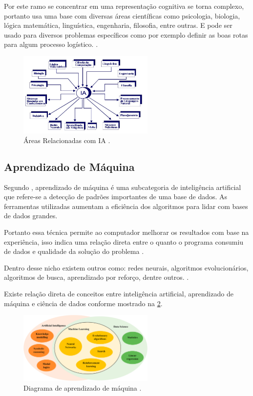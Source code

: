 \documentclass[
	12pt,				%
	openright,			%
	twoside,			%
	a4paper,			%
	english,			%
	french,				%
	spanish,			%
	brazil				%
	]{abntex2}
\begin{document}
Por este ramo se concentrar em uma representação cognitiva se torna complexo, portanto usa uma base com diversas áreas científicas como psicologia, biologia, lógica matemática, linguística, engenharia, filosofia, entre outras. E pode ser usado para diversos problemas específicos como por exemplo definir as boas rotas para algum processo logístico. \space\cite{ia_conceitos_aplicacoes}.

\begin{figure}[!ht]
	\centering
	\includegraphics[width=0.6\textwidth]{figures/areas_ia.jpg}
	\caption{Áreas Relacionadas com IA \cite{aplicacoes_ia_vg}.}	
	\label{fig:areas_ia}
\end{figure}

\subsection{Aprendizado de Máquina}

Segundo , aprendizado de máquina é uma subcategoria de inteligência artificial que refere-se a detecção de padrões importantes de uma base de dados. As ferramentas utilizadas aumentam a eficiência dos algoritmos para lidar com bases de dados grandes.

Portanto essa técnica permite ao computador melhorar os resultados com base na experiência, isso indica uma relação direta entre o quanto o programa consumiu de dados e qualidade da solução do problema \cite{ml_explicado}. 

Dentro desse nicho existem outros como: redes neurais, algoritmos evolucionários, algoritmos de busca, aprendizado por reforço, dentre outros. \cite{ml_oil_gas_industry}.

Existe relação direta de conceitos entre inteligência artificial, aprendizado de máquina e ciência de dados conforme mostrado na \cref{fig:diagrama_ia}. 
\begin{figure}[!ht]
	\centering
	\includegraphics[width=0.6\textwidth]{figures/diagrama_ia.jpg}
	\caption{Diagrama de aprendizado de máquina \cite{ml_oil_gas_industry}.}	
	\label{fig:diagrama_ia}
\end{figure}	
\end{document}
